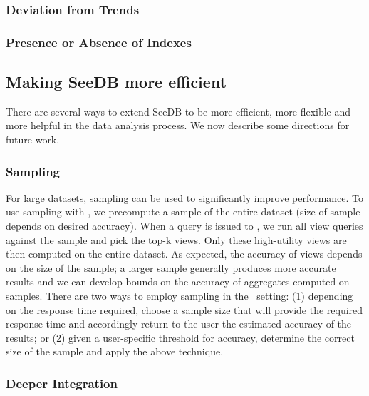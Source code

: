 \subsubsection{Deviation from Trends}

\subsubsection{Presence or Absence of Indexes}

\subsection{Making SeeDB more efficient} 
There are several ways to extend SeeDB to be more efficient, more
flexible and more helpful in the data analysis process. We now describe some
directions for future work.

\subsubsection {Sampling}
  For large datasets, sampling can be used to significantly improve
  performance. To use sampling with \SeeDB, we precompute a sample of the
  entire dataset (size of sample depends on desired accuracy). When a query is
  issued to \SeeDB, we run all view queries against the sample and pick the
  top-k views. Only these high-utility views are then computed on the entire
  dataset. As expected, the accuracy of views depends on the size of the sample;
  a larger sample generally produces more accurate results and we can develop
  bounds on the accuracy of aggregates computed on samples.
  There are two ways to employ sampling in the \SeeDB\ setting:
  (1) depending on the response time required, choose a sample size that will
  provide the required response time and accordingly return to the user the
  estimated accuracy of the results; or (2) given a user-specific threshold for
  accuracy, determine the correct size of the sample and apply the above
  technique. 
  

  \subsubsection{Deeper Integration}

